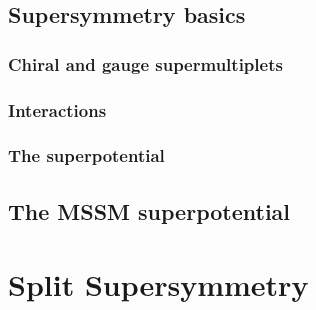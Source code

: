 \subsection{Supersymmetry basics}
\subsubsection{Chiral and gauge supermultiplets}
\subsubsection{Interactions}
\subsubsection{The superpotential}
\subsection{The MSSM superpotential}
\section{Split Supersymmetry}

